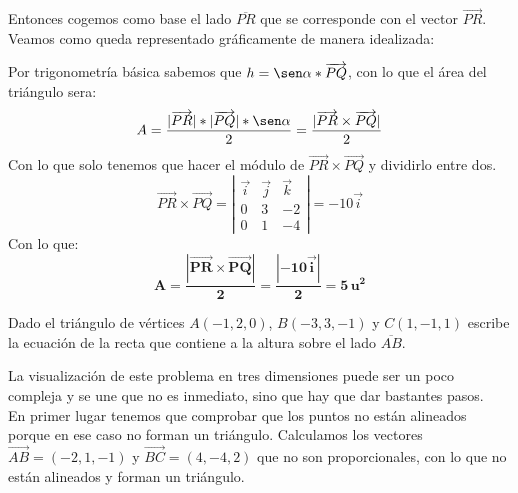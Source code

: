 \documentclass[a4paper,11pt,answers]{exam}
\begin{document}
\begin{questions}
\begin{solution}
Entonces cogemos como base el lado $\overline{PR}$ que se corresponde con el vector $\overrightarrow{PR}$. Veamos como queda representado gráficamente de manera idealizada:
\begin{center}
\end{center}
Por trigonometría básica sabemos que $h = \sen \alpha * \overrightarrow{PQ}$, con lo que el área del triángulo sera:
\[A = \frac{|\overrightarrow{PR}|* |\overrightarrow{PQ}|*\sen \alpha}{2} =
\frac{|\overrightarrow{PR} \times \overrightarrow{PQ}|}{2}\]
Con lo que solo tenemos que hacer el módulo de $\overrightarrow{PR} \times \overrightarrow{PQ}$ y dividirlo entre dos.
\[\overrightarrow{PR} \times \overrightarrow{PQ} = \left|\begin{array}{rrr}
\vec i&\vec j&\vec k\\0&3&-2\\0&1&-4
\end{array}\right| = -10\vec i\]
Con lo que:
\[\boldsymbol{A = \frac{|\overrightarrow{PR} \times \overrightarrow{PQ}|}{2} = \frac{|-10\vec{i} |}{2} = 5\,u^2}\]
\end{solution}

\question Dado el triángulo de vértices $A(-1,2,0)$, $B(-3,3,-1)$ y $C(1, -1, 1)$ escribe la ecuación de la recta que contiene a la altura sobre el lado $\overline{AB}$.
\begin{solution}
La visualización de este problema en tres dimensiones puede ser un poco compleja y se une que no es inmediato, sino que hay que dar bastantes pasos.\\

En primer lugar tenemos que comprobar que los puntos no están alineados porque en ese caso no forman un triángulo. Calculamos los vectores $\overrightarrow{AB} = (-2,1,-1)$ y $\overrightarrow{BC}=(4,-4,2)$ que no son proporcionales, con lo que no están alineados y forman un triángulo.\\


\end{solution}
\end{questions}
\end{document}
